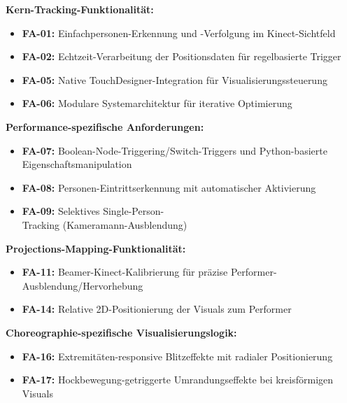 \textbf{Kern-Tracking-Funktionalität:}
\begin{itemize}
    \item \textbf{FA-01:} Einfachpersonen-Erkennung und -Verfolgung im Kinect-Sichtfeld
    \item \textbf{FA-02:} Echtzeit-Verarbeitung der Positionsdaten für regelbasierte Trigger
    \item \textbf{FA-05:} Native TouchDesigner-Integration für Visualisierungssteuerung
    \item \textbf{FA-06:} Modulare Systemarchitektur für iterative Optimierung
\end{itemize}

\textbf{Performance-spezifische Anforderungen:}
\begin{itemize}
    \item \textbf{FA-07:} Boolean-Node-Triggering/Switch-Triggers und Python-basierte Eigenschaftsmanipulation
    \item \textbf{FA-08:} Personen-Eintrittserkennung mit automatischer Aktivierung
    \item \textbf{FA-09:} Selektives Single-Person-\\Tracking (Kameramann-Ausblendung)
\end{itemize}

\textbf{Projections-Mapping-Funktionalität:}
\begin{itemize}
    \item \textbf{FA-11:} Beamer-Kinect-Kalibrierung für präzise Performer-Ausblendung/Hervorhebung
    \item \textbf{FA-14:} Relative 2D-Positionierung der Visuals zum Performer
\end{itemize}

\textbf{Choreographie-spezifische Visualisierungslogik:}
\begin{itemize}
    \item \textbf{FA-16:} Extremitäten-responsive Blitzeffekte mit radialer Positionierung
    \item \textbf{FA-17:} Hockbewegung-getriggerte Umrandungseffekte bei kreisförmigen Visuals
\end{itemize}